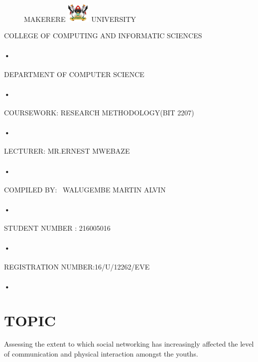 \documentclass[11pt,A4paper]{article}
\begin{document}
\begin{titlepage}
  \begin{figure}[h]
  \centerline{\small MAKERERE 
  \includegraphics[width=0.1\textwidth]{muk_log} UNIVERSITY}
\end{figure}
\centerline{COLLEGE OF COMPUTING AND INFORMATIC SCIENCES}
\paragraph{•}
\centerline{DEPARTMENT OF COMPUTER SCIENCE\\}
\paragraph{•}

\centerline{COURSEWORK: RESEARCH METHODOLOGY(BIT 2207)\\}
\paragraph{•}

\centerline{LECTURER: MR.ERNEST MWEBAZE}

\paragraph{•}
\centerline{COMPILED BY: \
 WALUGEMBE MARTIN ALVIN}
 \paragraph{•}
\centerline{STUDENT NUMBER : 216005016}
\paragraph{•}
\centerline{REGISTRATION NUMBER:16/U/12262/EVE}
\paragraph{•}
\end{titlepage}
\tableofcontents
\newpage
{}
\section{TOPIC}
Assessing the extent to which social networking has increasingly affected the level of communication and physical interaction amongst the youths.
\end{document}
